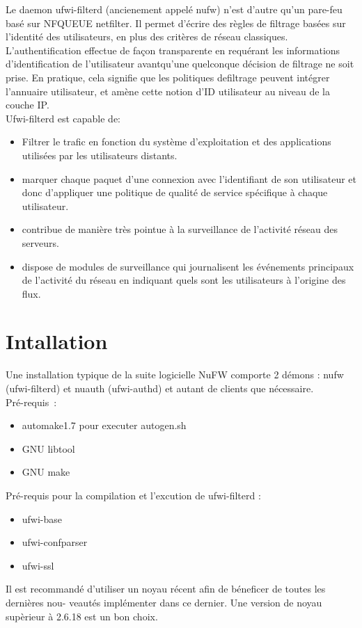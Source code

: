 \documentclass[12pt]{report}
\begin{document}
	Le daemon ufwi-filterd (ancienement appelé nufw) n'est d'autre qu'un pare-feu basé sur NFQUEUE netfilter. Il permet d'écrire des règles de filtrage basées sur l'identité des utilisateurs, en plus des critères de réseau classiques. L'authentification effectue de façon transparente en requérant les informations d’identification de l’utilisateur avantqu’une quelconque décision de filtrage ne soit prise. En pratique, cela signifie que les politiques defiltrage peuvent intégrer l’annuaire utilisateur, et amène cette notion d’ID utilisateur au niveau de la couche IP.\\
Ufwi-filterd est capable de:
\begin{itemize}
  \item Filtrer le trafic en fonction du système d’exploitation et des applications utilisées par les utilisateurs
     distants.
  \item marquer chaque paquet d'une connexion avec l'identifiant de son utilisateur et donc d'appliquer une politique de qualité de service spécifique à chaque utilisateur. 
  \item contribue de manière très pointue à la surveillance de l'activité réseau des serveurs.
  \item dispose de modules de surveillance qui journalisent les événements principaux de l'activité du réseau en indiquant quels sont les utilisateurs à l'origine des flux.
\end{itemize}
\section{Intallation}
Une installation typique de la suite logicielle NuFW comporte 2 démons : nufw (ufwi-filterd) et nuauth (ufwi-authd) et autant de clients que nécessaire.\\
Pré-requis :
\begin{itemize}
  \item automake1.7 pour executer autogen.sh
  \item GNU libtool
  \item GNU make
\end{itemize}
Pré-requis pour la compilation et l'excution de ufwi-filterd :
\begin{itemize}
  \item ufwi-base
  \item ufwi-confparser
  \item ufwi-ssl
\end{itemize}
Il est recommandé d'utiliser un noyau récent afin de béneficer de toutes les dernières nou-
veautés implémenter dans ce dernier. Une version de noyau supèrieur à 2.6.18 est un bon choix.
\newpage
\end{document}
